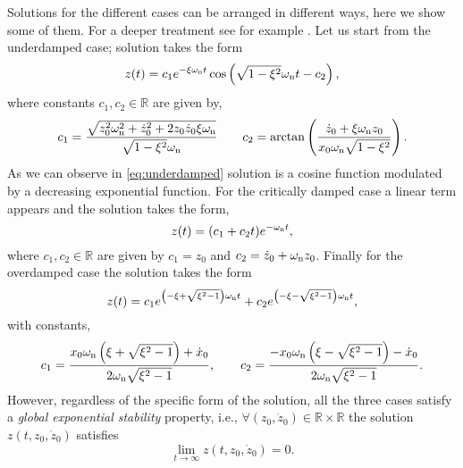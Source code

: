 Solutions for the different cases can be arranged in different ways,
here we show some of them. For a deeper treatment see for example
\cite{rao1995mechanical}.
Let us start from the underdamped case; solution takes the form
\begin{equation}
	\label{eq:underdamped}
	z(t) = c_ {1}e^{-\xi\omega_{\textnormal{n}}t}
	\cos\left({\sqrt{1-\xi^2}\omega_{\textnormal{n}}t-c_{2}}\right),
\end{equation}
where constants $c_{1},c_{2}\in\mathbb{R}$ are given by,
\begin{equation*}
  c_{1} = \frac{\sqrt{z_{0}^2
  \omega_{\textnormal{n}}^2+\dot{z}_{0}^2+2z_{0}\dot{z}_{0}\xi
  \omega_{\textnormal{n}}}}{\sqrt{1-\xi^2}\omega_{\textnormal{n}}}
  \qquad
   c_{2} = \mathrm{arctan}\left(\frac{\dot{z}_{0}+\xi\omega_{\textnormal{n}}z_{0}}
  { x_ {0}\omega_{\textnormal{n}}\sqrt{1-\xi^2}}\right).
\end{equation*}
As we can observe in \cref{eq:underdamped} solution is a cosine
function modulated by a decreasing exponential function.
For the critically damped case a linear term appears and the solution takes the form, 
\begin{equation}
	\label{eq:criticallydamped}
	z(t) = (c_{1}+c_{2}t)e^{-\omega_{\textnormal{n}}t},
\end{equation}
where $c_{1},c_{2}\in\mathbb{R}$ are given by $c_{1} = z_{0}$ and 
$c_{2} = \dot{z}_{0}+\omega_{\textnormal{n}}z_{0}$.
Finally for the overdamped case the solution takes the form
\begin{equation}
	\label{eq:overdamped}
	z(t) = c_{1}e^{\left(-\xi+\sqrt{\xi^2-1}\right)\omega_{\textnormal{n}}t} 
	+ c_{2}e^{\left(-\xi-\sqrt{\xi^2-1}\right)\omega_{\textnormal{n}}t}, 
\end{equation}
with constants, 
\begin{equation*}
  c_{1} = \frac{x_{0}\omega_{\textnormal{n}}
  \left(\xi+\sqrt{\xi^2-1}\right)+\dot{x}_{0}}{2\omega_{\textnormal{n}}\sqrt{\xi^2-1}},\qquad
  c_{2} = \frac{-x_{0}\omega_{\textnormal{n}}
  \left(\xi-\sqrt{\xi^2-1}\right)-\dot{x}_{0}}{2\omega_{\textnormal{n}}\sqrt{\xi^2-1}}.
\end{equation*}
However, regardless of the specific form of the solution,
all the three cases satisfy a \emph{global exponential stability}
property, i.e., $\forall(z_{0},\dot{z}_{0})\in\mathbb{R}\times\mathbb{R}$
the solution $z(t,z_{0},\dot{z}_{0})$ satisfies
\begin{equation*}
	\lim_{t\rightarrow\infty} z(t,z_{0},\dot{z}_{0}) = 0.
\end{equation*}
